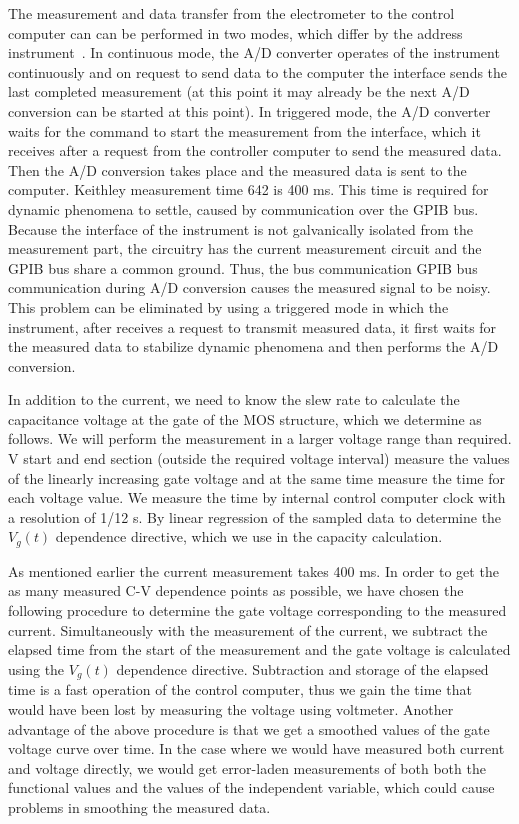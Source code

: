The measurement and data transfer from the electrometer to the control
computer can can be performed in two modes, which differ by the
address instrument~\cite{5.3}. In continuous mode, the A/D converter
operates of the instrument continuously and on request to send data to
the computer the interface sends the last completed measurement (at
this point it may already be the next A/D conversion can be started at
this point). In triggered mode, the A/D converter waits for the
command to start the measurement from the interface, which it receives
after a request from the controller computer to send the measured
data. Then the A/D conversion takes place and the measured data is
sent to the computer. Keithley measurement time 642 is 400 ms. This
time is required for dynamic phenomena to settle, caused by
communication over the GPIB bus. Because the interface of the
instrument is not galvanically isolated from the measurement part, the
circuitry has the current measurement circuit and the GPIB bus share
a common ground. Thus, the bus communication GPIB bus communication
during A/D conversion causes the measured signal to be noisy.  This
problem can be eliminated by using a triggered mode in which the
instrument, after receives a request to transmit measured data, it
first waits for the measured data to stabilize dynamic phenomena and
then performs the A/D conversion.

In addition to the current, we need to know the slew rate to calculate
the capacitance voltage at the gate of the MOS structure, which we
determine as follows.  We will perform the measurement in a larger
voltage range than required. V start and end section (outside the
required voltage interval) measure the values of the linearly
increasing gate voltage and at the same time measure the time for each
voltage value. We measure the time by internal control computer clock
with a resolution of 1/12 s. By linear regression of the sampled data
to determine the $V_{g}(t)$ dependence directive, which we use in the
capacity calculation.

As mentioned earlier the current measurement takes 400 ms.  In order
to get the as many measured C-V dependence points as possible, we have
chosen the following procedure to determine the gate voltage
corresponding to the measured current. Simultaneously with the
measurement of the current, we subtract the elapsed time from the
start of the measurement and the gate voltage is calculated using the
$V_{g}(t)$ dependence directive. Subtraction and storage of the
elapsed time is a fast operation of the control computer, thus we gain
the time that would have been lost by measuring the voltage using
voltmeter. Another advantage of the above procedure is that we get a
smoothed values of the gate voltage curve over time. In the case
where we would have measured both current and voltage directly, we
would get error-laden measurements of both both the functional values
and the values of the independent variable, which could cause problems
in smoothing the measured data.


